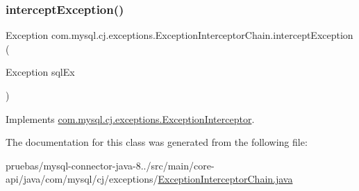\mbox{\label{classcom_1_1mysql_1_1cj_1_1exceptions_1_1_exception_interceptor_chain_a78c915d6aa11122e3fd845532ad29eb5}} 
\subsubsection{\texorpdfstring{intercept\+Exception()}{interceptException()}}
{\footnotesize\ttfamily Exception com.\+mysql.\+cj.\+exceptions.\+Exception\+Interceptor\+Chain.\+intercept\+Exception (\begin{DoxyParamCaption}\item[{Exception}]{sql\+Ex }\end{DoxyParamCaption})}



Implements \mbox{\hyperlink{interfacecom_1_1mysql_1_1cj_1_1exceptions_1_1_exception_interceptor_ab77cba0ffef1d2d6921d29e2eb79b072}{com.\+mysql.\+cj.\+exceptions.\+Exception\+Interceptor}}.



The documentation for this class was generated from the following file\+:\begin{DoxyCompactItemize}
\item 
pruebas/mysql-\/connector-\/java-\/8../src/main/core-\/api/java/com/mysql/cj/exceptions/\mbox{\hyperlink{_exception_interceptor_chain_8java}{Exception\+Interceptor\+Chain.\+java}}\end{DoxyCompactItemize}
